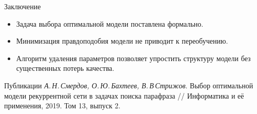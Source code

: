 \documentclass{beamer}
\begin{document}
\begin{frame}{Заключение}

\begin{itemize}
\item Задача выбора оптимальной модели поставлена формально.
\item Минимизация правдоподобия модели не приводит к переобучению.
\item Алгоритм удаления параметров позволяет упростить структуру модели без существенных потерь качества.
\end{itemize}

\begin{block}{Публикации}
\textit{А.\,Н.\,Смердов, О.\,Ю.\,Бахтеев, В.\,В\,Стрижов}. Выбор оптимальной модели рекуррентной сети в задачах поиска парафраза // Информатика и её применения, 2019. Том 13, выпуск 2.
\end{block}


\end{frame}
\end{document}

